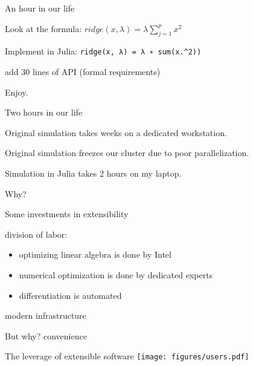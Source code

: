 \documentclass{beamer}
\newcommand{\monob}[1]{\mbox{\texttt{\textcolor{mypurple}{#1}}}}
\newenvironment{wideitemize}{
    \itemize\addtolength{\itemsep}{15pt}\addtolength{\topsep}{10pt}}{\enditemize}
\begin{document}
    \begin{frame}{An hour in our life}
      \begin{wideitemize}
        \item Look at the formula: $ridge(x, \lambda{}) = \lambda{}\sum^p_{j=1}x^2$
        \item Implement in Julia: \monob{ridge(x, λ) = λ ∗ sum(x.\^{}2))}
        \item add 30 lines of API (formal requirements)
        \item Enjoy.
      \end{wideitemize}
    \end{frame}

    \begin{frame}{Two hours in our life}
        \begin{wideitemize}
        \item Original simulation takes weeks on a dedicated workstation.
        \item Original simulation freezes our cluster due to poor parallelization.
        \item Simulation in Julia takes 2 hours on my laptop.
        \end{wideitemize}
    \end{frame}

    \begin{frame}{Why?}
        \begin{wideitemize}
        \item Some investments in extensibility
        \item division of labor: \begin{itemize}
            \item optimizing linear algebra is done by Intel
            \item numerical optimization is done by dedicated experts
            \item differentiation is automated
        \end{itemize}
        \item modern infrastructure
        \end{wideitemize}
    \end{frame}

    \begin{frame}{But why?}
    \centering \huge convenience
    \end{frame}
    
    \begin{frame}[c]{The leverage of extensible software}
    \centering
    \texttt{[image: figures/users.pdf]}
    \end{frame}
    
\end{document}
